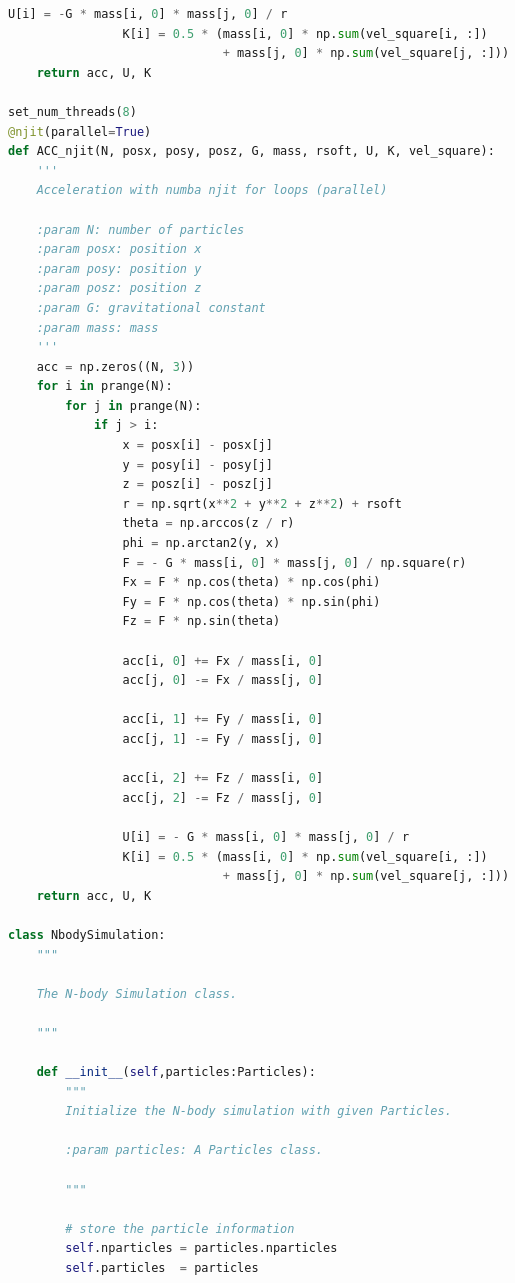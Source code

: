 \documentclass[12pt]{article}
\begin{document}
\begin{lstlisting}[language={Python}]
                U[i] = -G * mass[i, 0] * mass[j, 0] / r
                K[i] = 0.5 * (mass[i, 0] * np.sum(vel_square[i, :]) 
                              + mass[j, 0] * np.sum(vel_square[j, :]))
    return acc, U, K

set_num_threads(8)
@njit(parallel=True)
def ACC_njit(N, posx, posy, posz, G, mass, rsoft, U, K, vel_square):
    '''
    Acceleration with numba njit for loops (parallel)
    
    :param N: number of particles
    :param posx: position x
    :param posy: position y
    :param posz: position z
    :param G: gravitational constant
    :param mass: mass
    '''
    acc = np.zeros((N, 3))
    for i in prange(N):
        for j in prange(N):
            if j > i:
                x = posx[i] - posx[j]
                y = posy[i] - posy[j]
                z = posz[i] - posz[j]
                r = np.sqrt(x**2 + y**2 + z**2) + rsoft
                theta = np.arccos(z / r)
                phi = np.arctan2(y, x)
                F = - G * mass[i, 0] * mass[j, 0] / np.square(r)
                Fx = F * np.cos(theta) * np.cos(phi)
                Fy = F * np.cos(theta) * np.sin(phi)
                Fz = F * np.sin(theta)

                acc[i, 0] += Fx / mass[i, 0]
                acc[j, 0] -= Fx / mass[j, 0]

                acc[i, 1] += Fy / mass[i, 0]
                acc[j, 1] -= Fy / mass[j, 0]
                
                acc[i, 2] += Fz / mass[i, 0]
                acc[j, 2] -= Fz / mass[j, 0]
                
                U[i] = - G * mass[i, 0] * mass[j, 0] / r
                K[i] = 0.5 * (mass[i, 0] * np.sum(vel_square[i, :]) 
                              + mass[j, 0] * np.sum(vel_square[j, :]))
    return acc, U, K

class NbodySimulation:
    """
    
    The N-body Simulation class.
    
    """
    
    def __init__(self,particles:Particles):
        """
        Initialize the N-body simulation with given Particles.

        :param particles: A Particles class.  
        
        """

        # store the particle information
        self.nparticles = particles.nparticles
        self.particles  = particles


\end{lstlisting}
\end{document}
